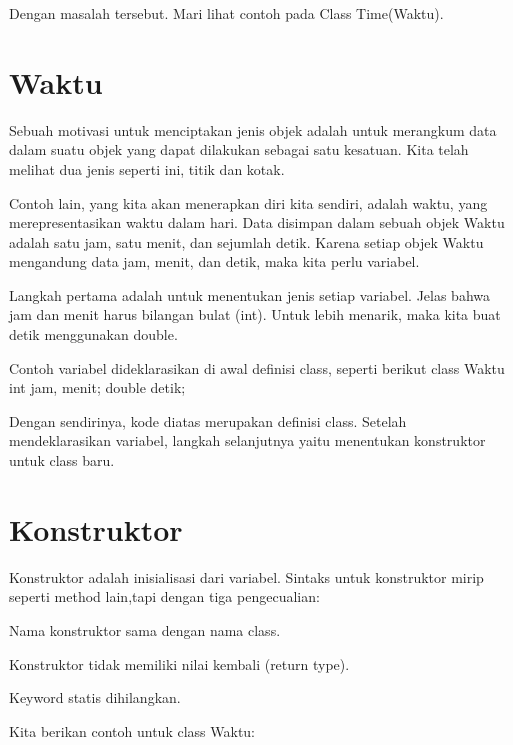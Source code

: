 Dengan masalah tersebut. Mari lihat contoh pada Class Time(Waktu).

\section{Waktu}

Sebuah motivasi untuk menciptakan jenis objek adalah untuk merangkum data dalam suatu objek yang dapat dilakukan sebagai satu kesatuan. Kita telah melihat dua jenis seperti ini, titik dan kotak.

Contoh lain, yang kita akan menerapkan diri kita sendiri, adalah waktu, yang merepresentasikan waktu dalam hari. Data disimpan dalam sebuah objek Waktu adalah satu jam, satu menit, dan sejumlah detik. Karena setiap objek Waktu mengandung data jam, menit, dan detik, maka kita perlu variabel.

Langkah pertama adalah untuk menentukan jenis setiap variabel. Jelas bahwa jam dan menit harus bilangan bulat (int). Untuk lebih menarik, maka kita buat detik menggunakan double.

Contoh variabel dideklarasikan di awal definisi class, seperti berikut
\newline
class Waktu \textbraceleft \newline
	int jam, menit; \newline
	double detik; \newline
\textbraceright

Dengan sendirinya, kode diatas merupakan definisi class. Setelah mendeklarasikan variabel, langkah selanjutnya yaitu menentukan konstruktor untuk class baru.


\section{Konstruktor}

Konstruktor adalah inisialisasi dari variabel. Sintaks untuk konstruktor mirip seperti method lain,tapi dengan tiga pengecualian: \newline

\textbullet Nama konstruktor sama dengan nama class. \newline

\textbullet Konstruktor tidak memiliki nilai kembali (return type). \newline

\textbullet Keyword statis dihilangkan. \newline

Kita berikan contoh untuk class Waktu: \newline

